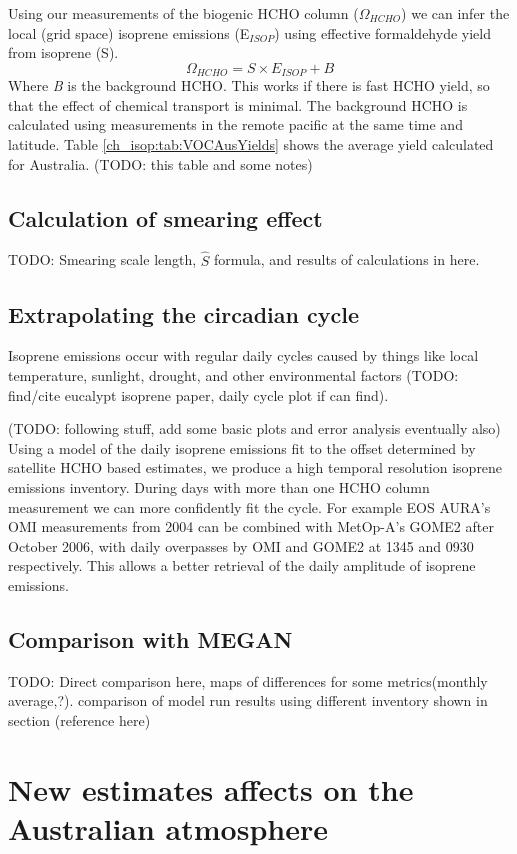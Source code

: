     Using our measurements of the biogenic HCHO column ($\Omega_{HCHO}$) we can infer the local (grid space) isoprene emissions (E$_{ISOP}$) using effective formaldehyde yield from isoprene (S).
    \begin{equation} \label{ch_isop:eqn:isop_yield}
      \Omega_{HCHO} = S \times E_{ISOP} + B
    \end{equation}
    Where \textit{B} is the background HCHO.
    This works if there is fast HCHO yield, so that the effect of chemical transport is minimal.
    The background HCHO is calculated using measurements in the remote pacific at the same time and latitude.
    Table \ref{ch_isop:tab:VOCAusYields} shows the average yield calculated for Australia. (TODO: this table and some notes)
    
  \subsection{Calculation of smearing effect}
    TODO: Smearing scale length, $\hat{S}$ formula, and results of calculations in here.
    
    
  \subsection{Extrapolating the circadian cycle}
    Isoprene emissions occur with regular daily cycles caused by things like local temperature, sunlight, drought, and other environmental factors (TODO: find/cite eucalypt isoprene paper, daily cycle plot if can find).
    
    (TODO: following stuff, add some basic plots and error analysis eventually also)
    Using a model of the daily isoprene emissions fit to the offset determined by satellite HCHO based estimates, we produce a high temporal resolution isoprene emissions inventory.
    During days with more than one HCHO column measurement we can more confidently fit the cycle. 
    For example EOS AURA's OMI measurements from 2004 can be combined with MetOp-A's GOME2 after October 2006, with daily overpasses by OMI and GOME2 at 1345 and 0930 respectively.
    This allows a better retrieval of the daily amplitude of isoprene emissions.
    
  \subsection{Comparison with MEGAN}
    TODO: Direct comparison here, maps of differences for some metrics(monthly average,?). comparison of model run results using different inventory shown in section (reference here)

\section{New estimates affects on the Australian atmosphere}

